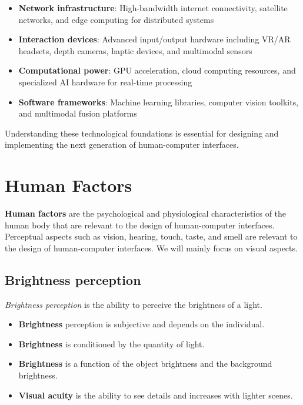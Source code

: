 \documentclass[11pt,a4paper]{article}
\theoremstyle{definition}
\theoremstyle{plain}
\theoremstyle{remark}
\begin{document}
\begin{itemize}
    \item \textbf{Network infrastructure}: High-bandwidth internet connectivity, satellite networks, and edge computing for distributed systems
    \item \textbf{Interaction devices}: Advanced input/output hardware including VR/AR headsets, depth cameras, haptic devices, and multimodal sensors
    \item \textbf{Computational power}: GPU acceleration, cloud computing resources, and specialized AI hardware for real-time processing
    \item \textbf{Software frameworks}: Machine learning libraries, computer vision toolkits, and multimodal fusion platforms
\end{itemize}

Understanding these technological foundations is essential for designing and implementing the next generation of human-computer interfaces. 



\section{Human Factors}

\textbf{Human factors} are the psychological and physiological characteristics of the human body that are relevant to the design of human-computer interfaces.
Perceptual aspects such as vision, hearing, touch, taste, and smell are relevant to the design of human-computer interfaces.
We will mainly focus on visual aspects.

\subsection{Brightness perception}
\textit{Brightness perception} is the ability to perceive the brightness of a light.

\begin{itemize}
    \item \textbf{Brightness} perception is subjective and depends on the individual.
    \item \textbf{Brightness} is conditioned by the quantity of light.
    \item \textbf{Brightness} is a function of the object brightness and the background brightness.
    \item \textbf{Visual acuity} is the ability to see details and increases with lighter scenes.
\end{itemize}
\end{document}
